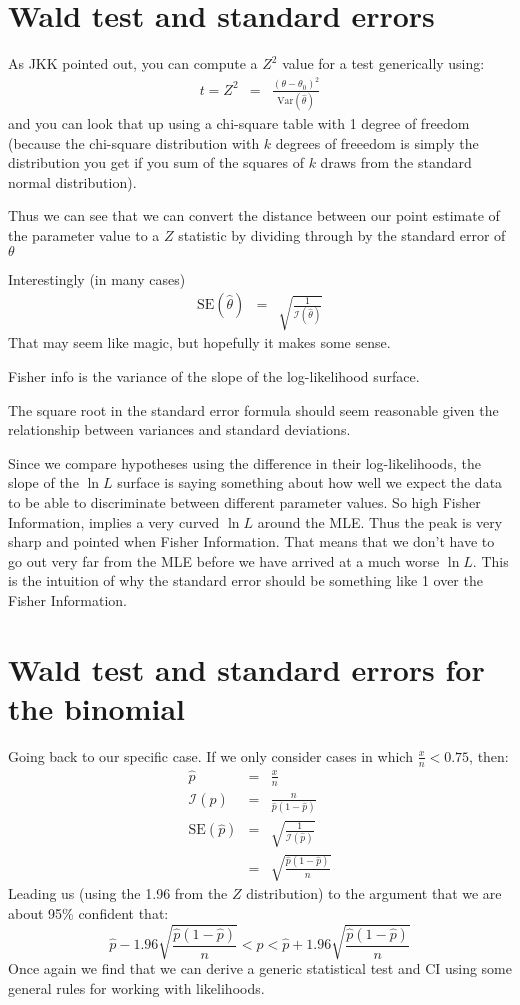 \documentclass[11pt]{article}
\begin{document}
\section*{Wald test and standard errors}
As JKK pointed out, you can compute a $Z^2$ value  for a test generically using:
\begin{eqnarray}
t = Z^2 & = & \frac{\left(\theta-\theta_0\right)^2}{\mbox{Var}(\hat{\theta})}
\end{eqnarray}
and you can look that up using a chi-square table with 1 degree of freedom (because the chi-square
distribution with $k$ degrees of freeedom is simply the distribution you get
if you sum of the squares of $k$ draws from the standard normal distribution).

Thus we can see that we can convert the distance between our point estimate of the parameter
    value to a $Z$ statistic by dividing through by the standard error
    of $\theta$

Interestingly (in many cases)
\begin{eqnarray}
\mbox{SE}(\hat{\theta}) & = & \sqrt{\frac{1}{ \mathcal{I}(\hat{\theta})}}
\end{eqnarray}
That may seem like magic, but hopefully it makes some sense.

Fisher info is the variance of the slope of the log-likelihood surface. 

The square root in the standard error formula should seem reasonable given the 
    relationship between variances and standard deviations.

Since we compare hypotheses using the difference in their log-likelihoods, the
    slope of the $\ln L$ surface is saying something about how well we 
    expect the data to be able to discriminate between different parameter values.
So high Fisher Information, implies a very curved $\ln L$ around the MLE.
Thus the peak is very sharp and pointed when Fisher Information.
That means that we don't have to go out very far from the MLE before we have 
    arrived at a much worse $\ln L$.
This is the intuition of why the standard error should be something like 1 over the Fisher Information.

\section*{Wald test and standard errors for the binomial}
Going back to our specific case.
If we only consider cases in which $\frac{x}{n} < 0.75$, then:
\begin{eqnarray}
\hat{p} & = & \frac{x}{n} \\
\mathcal{I}(\hat{p}) & = & \frac{n}{\hat{p}(1-\hat{p})} \\
\mbox{SE}(\hat{p}) & = & \sqrt{\frac{1}{ \mathcal{I}(\hat{p})}} \\
& = & \sqrt{\frac{\hat{p}(1-\hat{p})}{n}}
\end{eqnarray}
Leading us (using the 1.96 from the $Z$ distribution) to the argument that we are about
95\% confident that:
\[
\hat{p} - 1.96\sqrt{\frac{\hat{p}(1-\hat{p})}{n}} < p < \hat{p} + 1.96\sqrt{\frac{\hat{p}(1-\hat{p})}{n}} 
\]
Once again we find that we can derive a generic statistical test and CI using some general
    rules for working with likelihoods.
\end{document}
